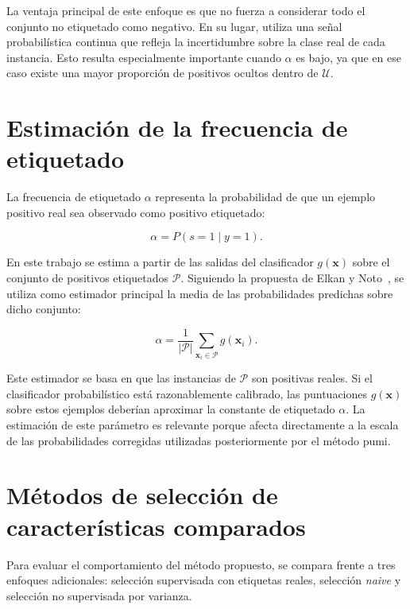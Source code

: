 La ventaja principal de este enfoque es que no fuerza a considerar todo el conjunto no etiquetado como negativo. En su lugar, utiliza una señal probabilística continua que refleja la incertidumbre sobre la clase real de cada instancia. Esto resulta especialmente importante cuando $\alpha$ es bajo, ya que en ese caso existe una mayor proporción de positivos ocultos dentro de $\mathcal{U}$.

\section{Estimación de la frecuencia de etiquetado}
\label{sec:estimacion_alpha}

La frecuencia de etiquetado $\alpha$ representa la probabilidad de que un ejemplo positivo real sea observado como positivo etiquetado:

\begin{equation}
\alpha = P(s=1 \mid y=1).
\label{eq:alpha_def}
\end{equation}

En este trabajo se estima a partir de las salidas del clasificador $g(\mathbf{x})$ sobre el conjunto de positivos etiquetados $\mathcal{P}$. Siguiendo la propuesta de Elkan y Noto~\cite{elkan2008learning}, se utiliza como estimador principal la media de las probabilidades predichas sobre dicho conjunto:

\begin{equation}
\hat{\alpha} =
\frac{1}{|\mathcal{P}|}
\sum_{\mathbf{x}_i \in \mathcal{P}}
g(\mathbf{x}_i).
\label{eq:alpha_hat}
\end{equation}

Este estimador se basa en que las instancias de $\mathcal{P}$ son positivas reales. Si el clasificador probabilístico está razonablemente calibrado, las puntuaciones $g(\mathbf{x})$ sobre estos ejemplos deberían aproximar la constante de etiquetado $\alpha$. La estimación de este parámetro es relevante porque afecta directamente a la escala de las probabilidades corregidas utilizadas posteriormente por el método \acrshort{pumi}.

\section[Métodos de selección]{Métodos de selección de características comparados}
\label{sec:metodos_comparados}

Para evaluar el comportamiento del método propuesto, se compara frente a tres enfoques adicionales: selección supervisada con etiquetas reales, selección \textit{naive} y selección no supervisada por varianza.

